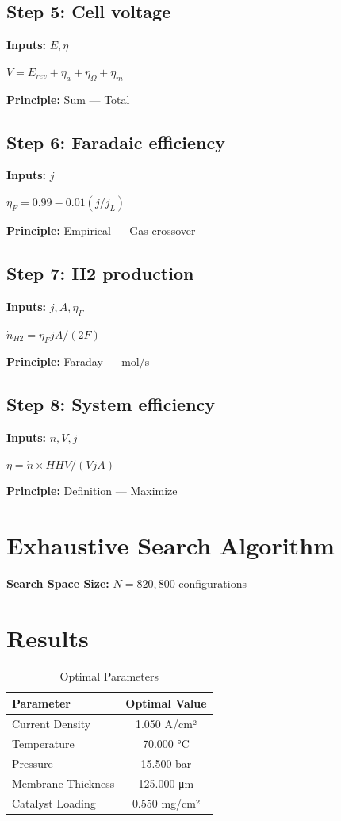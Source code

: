 \documentclass[11pt,twocolumn]{article}
\begin{document}
\subsection*{Step 5: Cell voltage}
\textbf{Inputs:} $E, \eta$

$V = E_{rev} + \eta_a + \eta_\Omega + \eta_m$

\textbf{Principle:} Sum --- Total

\subsection*{Step 6: Faradaic efficiency}
\textbf{Inputs:} $j$

$\eta_F = 0.99 - 0.01(j/j_L)$

\textbf{Principle:} Empirical --- Gas crossover

\subsection*{Step 7: H2 production}
\textbf{Inputs:} $j, A, \eta_F$

$\dot{n}_{H2} = \eta_F j A / (2F)$

\textbf{Principle:} Faraday --- mol/s

\subsection*{Step 8: System efficiency}
\textbf{Inputs:} $\dot{n}, V, j$

$\eta = \dot{n} \times HHV / (V j A)$

\textbf{Principle:} Definition --- Maximize


\section{Exhaustive Search Algorithm}

\textbf{Search Space Size:} $N = 820,800$ configurations

\section{Results}

\begin{table}[h]
\centering
\caption{Optimal Parameters}
\begin{tabular}{@{}lc@{}}
\toprule
Parameter & Optimal Value \\
\midrule
Current Density & 1.050 A/cm² \\
Temperature & 70.000 °C \\
Pressure & 15.500 bar \\
Membrane Thickness & 125.000 μm \\
Catalyst Loading & 0.550 mg/cm² \\
\bottomrule
\end{tabular}
\end{table}
\end{document}
